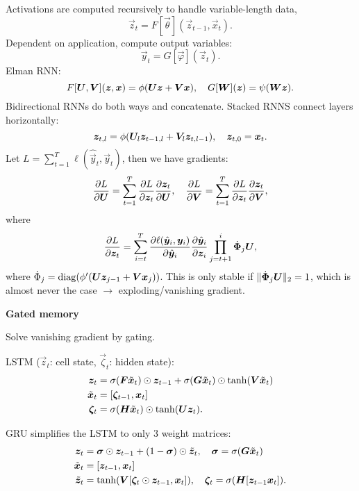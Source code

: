 \documentclass[10pt]{article}
\newenvironment{topic}[1]
{\textbf{\sffamily \colorbox{black}{\rlap{\textbf{\textcolor{white}{#1}}}\hspace{\linewidth}\hspace{-2\fboxsep}}}}
{}
\newenvironment{subtopic}[1]
{\begin{center}\textbf{\sffamily #1}\end{center}}
{}
\begin{document}
\begin{multicols*}{3}
\begin{topic}{Convolutional networks}
    \end{topic}

    \begin{topic}{Recurrent neural networks}
        Activations are computed recursively to handle variable-length data, \[
            \vec{z}_t = F[\vec{\theta}](\vec{z}_{t-1},\vec{x}_t).
        \]
        Dependent on application, compute output variables: \[
            \vec{y}_t = G[\vec{\varphi}](\vec{z}_t).
        \]
        Elman RNN: \[
            F[\bm{U},\bm{V}](\bm{z},\bm{x}) = \phi(\bm{U}\bm{z} + \bm{V}\bm{x}), \quad G[\bm{W}](\bm{z}) = \psi(\bm{W}\bm{z}).
        \]
        Bidirectional RNNs do both ways and concatenate. Stacked RNNS connect layers horizontally: \[
            \bm{z}_{t,l} = \phi(\bm{U}_l \bm{z}_{t-1,l} + \bm{V}_l \bm{z}_{t,l-1}), \quad \bm{z}_{t,0} = \bm{x}_t.
        \]
        Let $L = \sum_{t=1}^{T} \ell(\hat{\vec{y}}_t, \vec{y}_t)$, then we have gradients: \[
            \pdv{L}{\bm{U}} = \sum_{t=1}^{T} \pdv{L}{\bm{z}_t} \pdv{\bm{z}_t}{\bm{U}}, \quad \pdv{L}{\bm{V}} = \sum_{t=1}^{T} \pdv{L}{\bm{z}_t} \pdv{\bm{z}_t}{\bm{V}},
        \]
        where \[
            \pdv{L}{\bm{z}_t} = \sum_{i=t}^{T} \pdv{\ell(\hat{\bm{y}}_i, \bm{y}_i)}{\hat{\bm{y}}_i} \pdv{\hat{\bm{y}}_i}{\bm{z}_i} \prod_{j=t+1}^i \dot{\bm{\Phi}}_j \bm{U},
        \]
        where $\dot{\Phi}_j = \mathrm{diag}(\phi'(\bm{U}\bm{z}_{j-1} + \bm{V}\bm{x}_j))$. This is only
        stable if $\| \dot{\bm{\Phi}}_j \bm{U} \|_2 = 1$, which is almost never the case $\to$
        exploding/vanishing gradient.

        \begin{subtopic}{Gated memory}
            Solve vanishing gradient by gating.

            LSTM ($\vec{z}_t$: cell state, $\vec{\zeta}_t$: hidden state):
            \begin{align*}
                \bm{z}_t     & = \sigma(\bm{F}\tilde{\bm{x}}_t) \odot \bm{z}_{t-1} + \sigma(\bm{G}\tilde{\bm{x}}_t) \odot \tanh(\bm{V}\tilde{\bm{x}}_t) \\
                \tilde{\bm{x}}_t & = [\bm{\zeta}_{t-1}, \bm{x}_t] \\
                \bm{\zeta}_t & = \sigma(\bm{H}\tilde{\bm{x}}_t) \odot \tanh(\bm{U}\bm{z}_t).
            \end{align*}

            GRU simplifies the LSTM to only 3 weight matrices:
            \begin{align*}
                \bm{z}_t         & = \bm{\sigma} \odot \bm{z}_{t-1} + (1-\bm{\sigma}) \odot \tilde{\bm{z}}_t, \quad \bm{\sigma} = \sigma(\bm{G}\tilde{\bm{x}}_t) \\
                \tilde{\bm{x}}_t & = [\bm{z}_{t-1}, \bm{x}_t] \\
                \tilde{\bm{z}}_t & = \tanh(\bm{V}[\bm{\zeta}_t \odot \bm{z}_{t-1}, \bm{x}_t]), \quad \bm{\zeta}_t = \sigma(\bm{H}[\bm{z}_{t-1} \bm{x}_t]).
            \end{align*}
        \end{subtopic}


\end{topic}
\end{multicols*}
\end{document}
